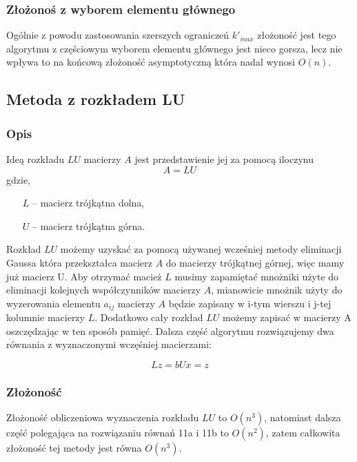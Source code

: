 \documentclass[12pt, a4paper]{article}
\begin{document}
\subsubsection*{Złożonoś z wyborem elementu głównego}
Ogólnie z powodu zastosowania szerszych ograniczeń $k'_{max}$ złożoność jest tego algorytmu z częściowym wyborem elementu głównego jest nieco gorsza, lecz nie wpływa to na końcową złożoność asymptotyczną która nadal wynosi $O(n)$.

\subsection{Metoda z rozkładem LU}
\subsubsection{Opis}
Ideą rozkładu ${LU}$ macierzy $A$ jest przedstawienie jej za pomocą iloczynu
\begin{equation}
A = LU
\end{equation}
gdzie,
\begin{itemize}
\item[$L$] -- macierz trójkątna dolna,
\item[$U$] -- macierz trójkątna górna.
\end{itemize}

\noindent Rozkład $LU$ możemy uzyskać za pomocą używanej wcześniej metody eliminacji Gaussa która przekształca macierz $A$ do macierzy trójkątnej górnej, więc mamy już macierz U. Aby otrzymać macież $L$ musimy zapamiętać mnożniki użyte do eliminacji kolejnych współczynników macierzy $A$, mianowicie mnożnik użyty do wyzerowania elementu $a_{ij}$ macierzy $A$ będzie zapisany w i-tym wierszu i j-tej kolumnie macierzy $L$. Dodatkowo cały rozkład $LU$ możemy zapisać w macierzy A oszczędzając w ten sposób pamięć. Dalsza część algorytmu rozwiązujemy dwa równania z wyznaczonymi wczęśniej macierzami:

\begin{subequations}
\begin{equation}
Lz = b
\end{equation}
\begin{equation}
Ux = z
\end{equation}
\end{subequations}

\subsubsection*{Złożoność}
Złożoność obliczeniowa wyznaczenia rozkładu $LU$ to $O(n^3)$, natomiast dalsza część polegająca na rozwiązaniu równań 11a i 11b to $O(n^2)$, zatem całkowita złożoność tej metody jest równa $O(n^3)$.
\end{document}

